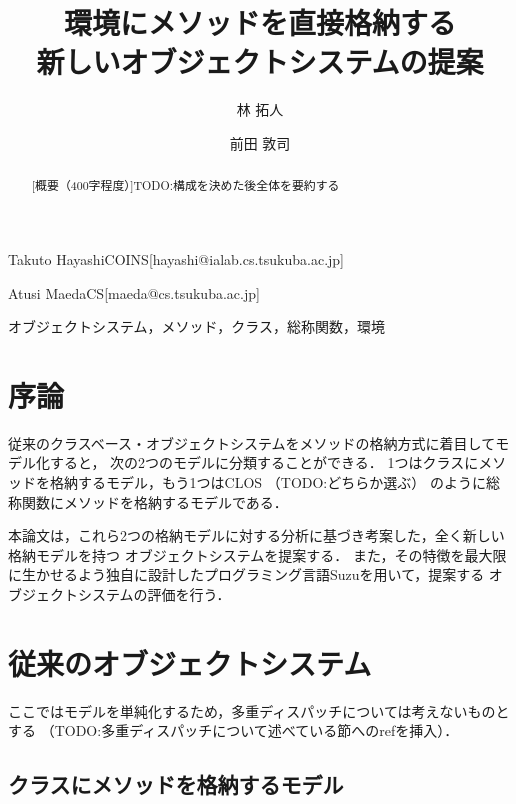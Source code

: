 \documentclass[withpage]{ipsjprosym}  %
\begin{document}
\title{環境にメソッドを直接格納する \\ 新しいオブジェクトシステムの提案}


\author{林 拓人}{Takuto Hayashi}{COINS}[hayashi@ialab.cs.tsukuba.ac.jp]
\author{前田 敦司}{Atusi Maeda}{CS}[maeda@cs.tsukuba.ac.jp]

\begin{abstract}
[概要（400字程度）]TODO:構成を決めた後全体を要約する
\end{abstract}

\begin{jkeyword}
オブジェクトシステム，メソッド，クラス，総称関数，環境
\end{jkeyword}

\maketitle

\section{序論}

従来のクラスベース・オブジェクトシステムをメソッドの格納方式に着目してモデル化すると，
次の2つのモデルに分類することができる．
1つはクラスにメソッドを格納するモデル，もう1つはCLOS
\cite{CLOS}\cite{DeMichiel:1987:CLO:646147.679028}（TODO:どちらか選ぶ）
のように総称関数にメソッドを格納するモデルである．

本論文は，これら2つの格納モデルに対する分析に基づき考案した，全く新しい格納モデルを持つ
オブジェクトシステムを提案する．
また，その特徴を最大限に生かせるよう独自に設計したプログラミング言語Suzuを用いて，提案する
オブジェクトシステムの評価を行う．

\section{従来のオブジェクトシステム}

ここではモデルを単純化するため，多重ディスパッチについては考えないものとする
（TODO:多重ディスパッチについて述べている節へのrefを挿入）．

\subsection{クラスにメソッドを格納するモデル}
\end{document}
